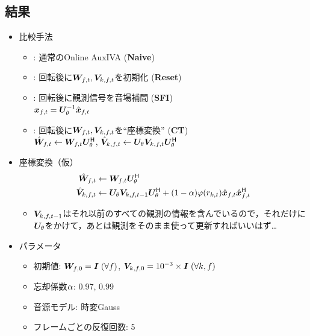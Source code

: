 \documentclass[twocolumn,9pt,dvipdfmx]{article}
\begin{document}
\subsection{結果}
\begin{itemize}
  \item 比較手法
    \begin{itemize}
      \item {}: 通常のOnline AuxIVA (\textbf{Naive})
      \item {}: 回転後に$\Demix _{\ft}, \cov _{\src,\ft}$を初期化 (\textbf{Reset})
      \item {}: 回転後に観測信号を音場補間 (\textbf{SFI})\\
        $\Obs _{\ft} = \rotMat _{\rotDeg} ^{-1} \rotObs _{\ft}$
      \item {}: 回転後に$\Demix _{\ft}, \cov _{\src,\ft}$を``座標変換'' (\textbf{CT})\\
        $\rotDemix _{\ft} \gets \Demix _{\ft} \rotMat _{\rotDeg} ^{\hermite}$,\; $\rotCov _{\src,\ft} \gets \rotMat _{\rotDeg} \cov _{\src,\ft} \rotMat _{\rotDeg} ^{\hermite}$
    \end{itemize}
  \item 座標変換（仮）
    \begin{align*}
      \rotDemix _{\ft} &\gets \Demix _{\ft} \rotMat _{\rotDeg} ^{\hermite} \\
      \rotCov _{\src,\ft} &\gets \rotMat _{\rotDeg} \cov _{\src,\ft[-1]} \rotMat _{\rotDeg} ^{\hermite} + (1 - \forget) \weight(\var _{\src,\tframe}) \rot{\Obs} _{\ft} \rot{\Obs} _{\ft} ^{\hermite}
    \end{align*}
    \begin{itemize}
      \item $\cov _{\src,\ft[-1]}$はそれ以前のすべての観測の情報を含んでいるので，それだけに$\bm{U} _{\theta}$をかけて，あとは観測をそのまま使って更新すればいいはず…
    \end{itemize}
  \item パラメータ
    \begin{itemize}
      \item 初期値: $\bm{W} _{f,0} = \bm{I}\; (\forall f)$, $\bm{V} _{k,f,0} = 10^{-3}\times\bm{I}\; (\forall k, f)$
      \item 忘却係数$\alpha$: 0.97, 0.99
      \item 音源モデル: 時変Gauss
      \item フレームごとの反復回数: 5
    \end{itemize}
\end{itemize}
\end{document}
